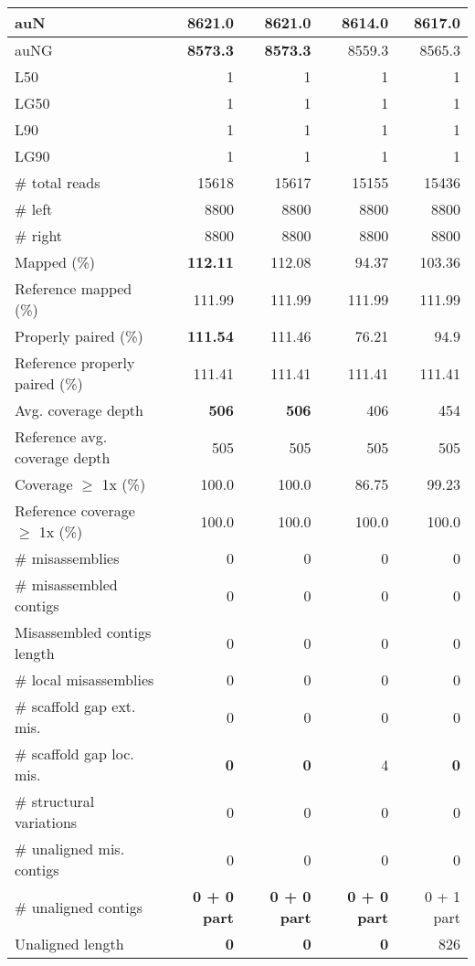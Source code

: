 \documentclass[12pt,a4paper]{article}
\begin{document}
\begin{table}[ht]
\begin{center}
\begin{tabular}{|l*{4}{|r}|}
auN & {\bf 8621.0} & {\bf 8621.0} & 8614.0 & 8617.0 \\ \hline
auNG & {\bf 8573.3} & {\bf 8573.3} & 8559.3 & 8565.3 \\ \hline
L50 & 1 & 1 & 1 & 1 \\ \hline
LG50 & 1 & 1 & 1 & 1 \\ \hline
L90 & 1 & 1 & 1 & 1 \\ \hline
LG90 & 1 & 1 & 1 & 1 \\ \hline
\# total reads & 15618 & 15617 & 15155 & 15436 \\ \hline
\# left & 8800 & 8800 & 8800 & 8800 \\ \hline
\# right & 8800 & 8800 & 8800 & 8800 \\ \hline
Mapped (\%) & {\bf 112.11} & 112.08 & 94.37 & 103.36 \\ \hline
Reference mapped (\%) & 111.99 & 111.99 & 111.99 & 111.99 \\ \hline
Properly paired (\%) & {\bf 111.54} & 111.46 & 76.21 & 94.9 \\ \hline
Reference properly paired (\%) & 111.41 & 111.41 & 111.41 & 111.41 \\ \hline
Avg. coverage depth & {\bf 506} & {\bf 506} & 406 & 454 \\ \hline
Reference avg. coverage depth & 505 & 505 & 505 & 505 \\ \hline
Coverage $\geq$ 1x (\%) & 100.0 & 100.0 & 86.75 & 99.23 \\ \hline
Reference coverage $\geq$ 1x (\%) & 100.0 & 100.0 & 100.0 & 100.0 \\ \hline
\# misassemblies & 0 & 0 & 0 & 0 \\ \hline
\# misassembled contigs & 0 & 0 & 0 & 0 \\ \hline
Misassembled contigs length & 0 & 0 & 0 & 0 \\ \hline
\# local misassemblies & 0 & 0 & 0 & 0 \\ \hline
\# scaffold gap ext. mis. & 0 & 0 & 0 & 0 \\ \hline
\# scaffold gap loc. mis. & {\bf 0} & {\bf 0} & 4 & {\bf 0} \\ \hline
\# structural variations & 0 & 0 & 0 & 0 \\ \hline
\# unaligned mis. contigs & 0 & 0 & 0 & 0 \\ \hline
\# unaligned contigs & {\bf 0 + 0 part} & {\bf 0 + 0 part} & {\bf 0 + 0 part} & 0 + 1 part \\ \hline
Unaligned length & {\bf 0} & {\bf 0} & {\bf 0} & 826 \\ \hline

\end{tabular}
\end{center}
\end{table}
\end{document}
